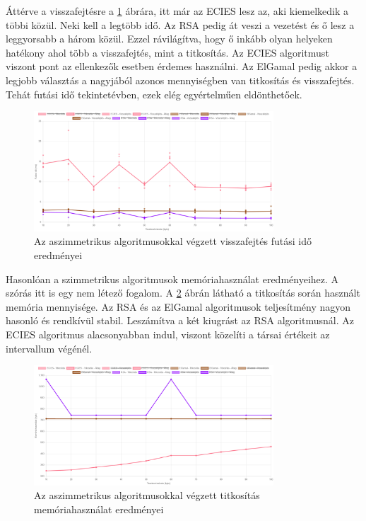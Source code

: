 \documentclass[12pt]{report} %
\begin{document}
Áttérve a visszafejtésre a \ref{fig:AsymmetricDecryptionRunTime} ábrára, itt már az ECIES lesz az, aki kiemelkedik a többi közül. Neki kell a legtöbb idő. Az RSA pedig át veszi a vezetést és ő lesz a leggyorsabb a három közül. Ezzel rávilágítva, hogy ő inkább olyan helyeken hatékony ahol több a visszafejtés, mint a titkosítás. Az ECIES algoritmust viszont pont az ellenkezők esetben érdemes használni. Az ElGamal pedig akkor a legjobb választás a nagyjából azonos mennyiségben van titkosítás és visszafejtés. Tehát futási idő tekintetévben, ezek elég egyértelműen eldönthetőek.

\begin{figure}[H]
    \centering %
    \includegraphics[width=0.8\textwidth]{Figures/AsymmetricDecryptionRunTime.png} %
    \caption{Az aszimmetrikus algoritmusokkal végzett visszafejtés futási idő eredményei} %
    \label{fig:AsymmetricDecryptionRunTime} %
\end{figure}

Hasonlóan a szimmetrikus algoritmusok memóriahasználat eredményeihez. A szórás itt is egy nem létező fogalom. A \ref{fig:AsymmetricEncryptionMemoryUsage} ábrán látható a titkosítás során használt memória mennyisége. Az RSA és az ElGamal algoritmusok teljesítmény nagyon hasonló és rendkívül stabil. Leszámítva a két kiugrást az RSA algoritmusnál. Az ECIES algoritmus alacsonyabban indul, viszont közelíti a társai értékeit az intervallum végénél.

\begin{figure}[H]
    \centering %
    \includegraphics[width=0.8\textwidth]{Figures/AsymmetricEncryptionMemoryUsage.png} %
    \caption{Az aszimmetrikus algoritmusokkal végzett titkosítás memóriahasználat eredményei} %
    \label{fig:AsymmetricEncryptionMemoryUsage} %
\end{figure}
\end{document}

